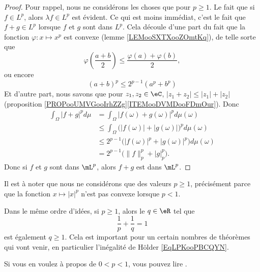 \begin{proof}
    Pour rappel, nous ne considérons les choses que pour \( p\geq 1\). Le fait que si \( f\in L^p\), alors \( \lambda f\in L^p\) est évident. Ce qui est moins immédiat, c'est le fait que \( f+g\in L^p\) lorsque \( f\) et \( g\) sont dans \( L^p\). Cela découle d'une part du fait que la fonction \( \varphi\colon x\mapsto x^p\) est convexe (lemme \ref{LEMooSXTXooZOmtKq}), de telle sorte que
    \begin{equation}
        \varphi\left( \frac{ a+b }{2} \right)\leq\frac{ \varphi(a)+\varphi(b) }{2},
    \end{equation}
    ou encore
    \begin{equation}    \label{EqZFSduFa}
        (a+b)^p\leq 2^{p-1}(a^p+b^p)
    \end{equation}
    Et d'autre part, nous savons que pour \( z_1,z_2\in \eC\), \( | z_1+z_2 |\leq | z_1 |+| z_2 |\) (proposition \ref{PROPooUMVGooIrhZZg}\ref{ITEMooDVMDooFDmOur}). Donc
    \begin{subequations}        \label{EQooKRMEooSLHUUc}
        \begin{align}
            \int_{\Omega}| f+g |^pd\mu&=\int_{\Omega}| f(\omega)+g(\omega) |^pd\mu(\omega)\\
            &\leq \int_{\Omega}\big( | f(\omega) |+| g(\omega) | \big)^pd\mu(\omega)\\
            &\leq 2^{p-1}\big( | f(\omega) |^p+| g(\omega) |^p \big)d\mu(\omega)\\
            &=2^{p-1}\big( \| f \|_p^p+| g |_p^p \big).
        \end{align}
    \end{subequations}
    Donc si \( f\) et \( g\) sont dans \( \mL^p\), alors \( f+g\) est dans \( \mL^p\).
\end{proof}

\begin{normaltext}
    Il est à noter que nous ne considérons que des valeurs \( p\geq 1\), précisément parce que la fonction \( x\mapsto | x |^p\) n'est pas convexe lorsque \( p<1\).

    Dans le même ordre d'idées, si \( p\geq 1\), alors le \( q\in \eR\) tel que
    \begin{equation}
        \frac{1}{ p }+\frac{1}{ q }=1
    \end{equation}
    est également \( q\geq 1\). Cela est important pour un certain nombres de théorèmes qui vont venir, en particulier l'inégalité de Hölder \eqref{EqLPKooPBCQYN}.

    Si vous en voulez à propos de \( 0<p<1\), vous pouvez lire \cite{ooECQXooZUqbSO}.
\end{normaltext}

